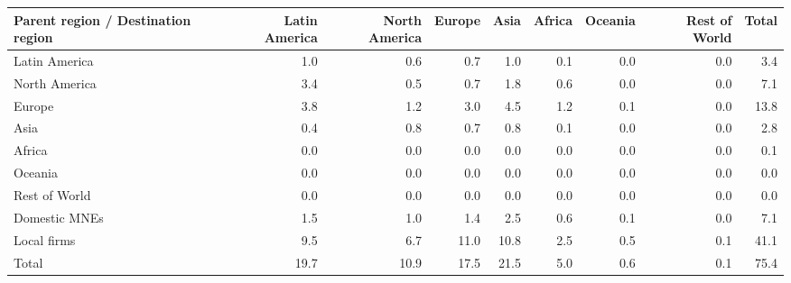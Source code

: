 \begin{tabular}{lrrrrrrrr}
\toprule
Parent region / Destination region & Latin America & North America & Europe & Asia & Africa & Oceania & Rest of World & Total \\
\midrule
Latin America & 1.0 & 0.6 & 0.7 & 1.0 & 0.1 & 0.0 & 0.0 & 3.4 \\
North America & 3.4 & 0.5 & 0.7 & 1.8 & 0.6 & 0.0 & 0.0 & 7.1 \\
Europe & 3.8 & 1.2 & 3.0 & 4.5 & 1.2 & 0.1 & 0.0 & 13.8 \\
Asia & 0.4 & 0.8 & 0.7 & 0.8 & 0.1 & 0.0 & 0.0 & 2.8 \\
Africa & 0.0 & 0.0 & 0.0 & 0.0 & 0.0 & 0.0 & 0.0 & 0.1 \\
Oceania & 0.0 & 0.0 & 0.0 & 0.0 & 0.0 & 0.0 & 0.0 & 0.0 \\
Rest of World & 0.0 & 0.0 & 0.0 & 0.0 & 0.0 & 0.0 & 0.0 & 0.0 \\
Domestic MNEs & 1.5 & 1.0 & 1.4 & 2.5 & 0.6 & 0.1 & 0.0 & 7.1 \\
Local firms & 9.5 & 6.7 & 11.0 & 10.8 & 2.5 & 0.5 & 0.1 & 41.1 \\
\midrule
Total & 19.7 & 10.9 & 17.5 & 21.5 & 5.0 & 0.6 & 0.1 & 75.4 \\
\bottomrule
\end{tabular}
